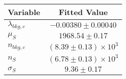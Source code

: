 \begin{tabular}[t]{lc}
\hline
Variable &Fitted Value\\
\hline\hline
$\lambda_{bkg,c}$&$-0.00380\pm0.00040$\\
\hline
$\mu_{S}$&$1968.54\pm0.17$\\
\hline
$n_{bkg,c}$&$(8.39\pm0.13)\times 10^3$\\
\hline
$n_{S}$&$(6.78\pm0.13)\times 10^3$\\
\hline
$\sigma_{S}$&$9.36\pm0.17$\\
\hline
\end{tabular}